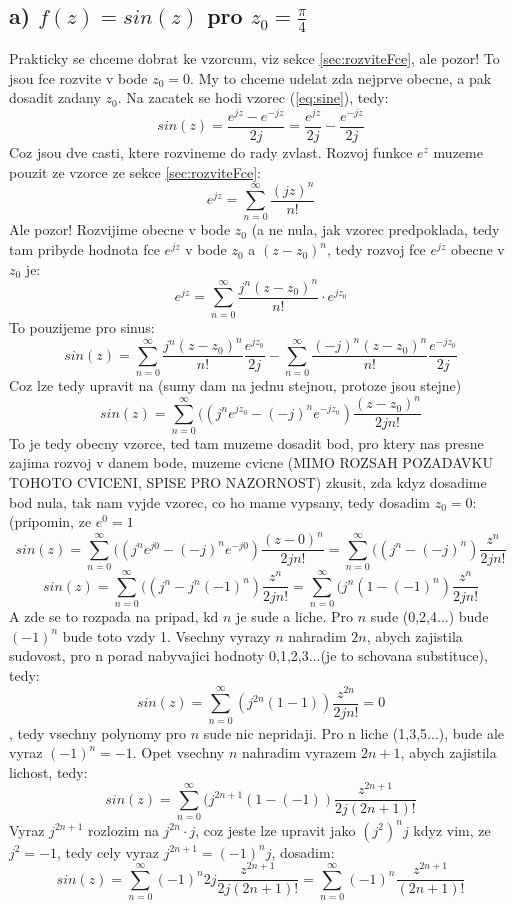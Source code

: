 \subsection*{a) $f(z) = sin(z)$ pro $z_0 = \frac{\pi}{4}$}
Prakticky se chceme dobrat ke vzorcum, viz sekce \ref{sec:rozviteFce}, ale pozor! To jsou fce rozvite v bode $z_0 = 0$. My to chceme udelat zda nejprve obecne, a pak dosadit zadany $z_0$.
Na zacatek se hodi vzorec (\ref{eq:sine}), tedy:
$$sin(z) = \frac{e^{jz}-e^{-jz}}{2j} = \frac{e^{jz}}{2j} - \frac{e^{-jz}}{2j}$$
Coz jsou dve casti, ktere rozvineme do rady zvlast. Rozvoj funkce $e^z$ muzeme pouzit ze vzorce ze sekce \ref{sec:rozviteFce}:
$$e^{jz} = \sum_{n=0}^\infty \frac{(jz)^n}{n!}$$ 
Ale pozor! Rozvijime obecne v bode $z_0$ (a ne nula, jak vzorec predpoklada, tedy tam pribyde hodnota fce $e^{jz}$ v bode $z_0$ a $(z-z_0)^n$, tedy rozvoj fce $e^{jz}$ obecne v $z_0$ je:
$$e^{jz}=\sum_{n=0}^\infty \frac{j^n(z-z_0)^n}{n!}\cdot e^{jz_0}$$
To pouzijeme pro sinus:
$$sin(z) = \sum_{n=0}^\infty \frac{j^n (z-z_0)^n}{n!}\frac{e^{jz_0}}{2j} - \sum_{n=0}^\infty \frac{(-j)^n (z-z_0)^n}{n!}\frac{e^{-jz_0}}{2j}$$
Coz lze tedy upravit na (sumy dam na jednu stejnou, protoze jsou stejne)
$$sin(z) = \sum_{n=0}^\infty ((j^n e^{jz_0} -(-j)^{n}e^{-jz_0})\frac{(z-z_0)^n}{2jn!}$$
To je tedy obecny vzorce, ted tam muzeme dosadit bod, pro ktery nas presne zajima rozvoj v danem bode, muzeme cvicne (MIMO ROZSAH POZADAVKU TOHOTO CVICENI, SPISE PRO NAZORNOST) zkusit, zda kdyz dosadime bod nula, tak nam vyjde vzorec, co ho mame vypsany, tedy dosadim $z_0 = 0$: (pripomin, ze $e^{0} =1 $
$$sin(z) =  \sum_{n=0}^\infty ((j^n e^{j0} -(-j)^{n}e^{-j0})\frac{(z-0)^n}{2jn!}=  \sum_{n=0}^\infty ((j^n -(-j)^{n})\frac{z^n}{2jn!}$$
$$sin(z) = \sum_{n=0}^\infty ((j^n -j^n(-1)^{n})\frac{z^n}{2jn!} = \sum_{n=0}^\infty (j^n(1 -(-1)^{n})\frac{z^n}{2jn!}$$
A zde se to rozpada na pripad, kd $n$ je sude a liche. Pro $n$ sude (0,2,4...) bude $(-1)^n$ bude toto vzdy 1. Vsechny vyrazy $n$ nahradim $2n$, abych zajistila sudovost, pro n porad nabyvajici hodnoty 0,1,2,3...(je to schovana substituce), tedy:
$$sin(z) = \sum_{n=0}^\infty (j^{2n}(1 -1))\frac{z^{2n}}{2jn!} = 0$$,
tedy vsechny polynomy pro $n$ sude nic nepridaji. Pro n liche (1,3,5...), bude ale vyraz $(-1)^n = -1$. Opet vsechny $n$ nahradim vyrazem $2n+1$, abych zajistila lichost, tedy:
$$sin(z) = \sum_{n=0}^\infty (j^{2n+1}(1 -(-1))\frac{z^{2n+1}}{2j(2n+1)!} $$
Vyraz $j^{2n+1}$ rozlozim na $j^{2n}\cdot j$, coz jeste lze upravit jako $(j^2)^n j$ kdyz vim, ze $j^2=-1$, tedy cely vyraz $j^{2n+1} = (-1)^n j$, dosadim:
$$sin(z) = \sum_{n=0}^\infty (-1)^n 2 j \frac{z^{2n+1}}{2j(2n+1)!} = \sum_{n=0}^\infty (-1)^n \frac{z^{2n+1}}{(2n+1)!} $$
